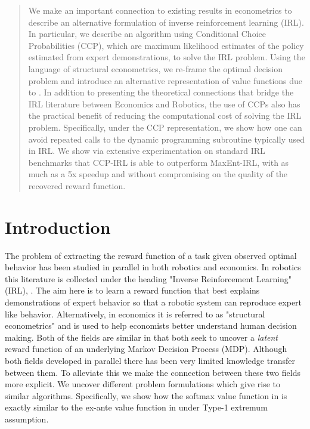\documentclass{article}
\begin{document}
\begin{abstract}
We make an important connection to existing results in econometrics to describe an alternative formulation of inverse reinforcement learning (IRL). In particular, we describe an algorithm using Conditional Choice Probabilities (CCP), which are maximum likelihood estimates of the policy estimated from expert demonstrations, to solve the IRL problem. Using the language of structural econometrics, we re-frame the optimal decision problem and introduce an alternative representation of value functions due to \cite{hotz}. In addition to presenting the theoretical connections that bridge the IRL literature between Economics and Robotics, the use of CCPs also has the practical benefit of reducing the computational cost of solving the IRL problem. Specifically, under the CCP representation, we show how one can avoid repeated calls to the dynamic programming subroutine typically used in IRL. 
We show via extensive experimentation on standard IRL benchmarks that CCP-IRL is able to outperform MaxEnt-IRL, with as much as a 5x speedup and without compromising on the quality of the recovered reward function.

\end{abstract} 

\section{Introduction}

The problem of extracting the reward function of a task given observed optimal behavior has been studied in parallel in both robotics and economics. In robotics this literature is collected under the heading "Inverse Reinforcement Learning" (IRL), \cite{Ng2000, abbeel2004apprenticeship}. The aim here is to learn a reward function that best explains demonstrations of expert behavior so that a robotic system can reproduce expert like behavior. Alternatively, in economics it is referred to as "structural econometrics" \cite{miller, pakes, rust_gmc} and is used to help economists better understand human decision making. Both of the fields are similar in that both seek to uncover a \emph{latent} reward function of an underlying Markov Decision Process (MDP).
Although both fields developed in parallel there has been very limited knowledge transfer between them. To alleviate this we make the connection between these two fields more explicit. We uncover different problem formulations which give rise to similar algorithms. Specifically, we show how the softmax value function in \cite{ziebart} is exactly similar to the ex-ante value function in \cite{rust_gmc} under Type-1 extremum assumption.
\end{document}
